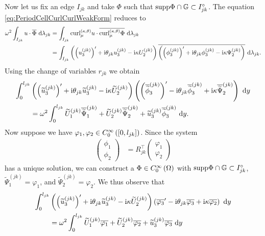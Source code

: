 Now let us fix an edge $I_{jk}$ and take $\Phi$ such that $\mathrm{supp}\Phi\cap\mathbb{G}\subset I_{jk}^{\circ}$.
The equation \eqref{eq:PeriodCellCurlCurlWeakForm} reduces to
\begin{align*}
	\omega^2 \int_{I_{jk}} u\cdot\overline{\Phi}  \ \mathrm{d}\lambda_{jk}
	&= \int_{I_{jk}} \mathrm{curl}_{\mu}^{\left( \kappa, \theta \right)}u\cdot\overline{\mathrm{curl}_{\mu}^{\left( \kappa, \theta \right)}\Phi}  \ \mathrm{d}\lambda_{jk} \\
	&= \int_{I_{jk}} \left(  \left( u_3^{(jk)} \right)' + \mathrm{i}\theta_{jk} u_3^{(jk)} - \mathrm{i}\kappa U_2^{(jk)}  \right)\overline{\left(  \left( \phi_3^{(jk)} \right)' + \mathrm{i}\theta_{jk} \phi_3^{(jk)} - \mathrm{i}\kappa \Psi_2^{(jk)}  \right)}  \ \mathrm{d}\lambda_{jk}.
\end{align*}
Using the change of variables $r_{jk}$ we obtain
\begin{align*}
	\int_0^{l_{jk}} & \left(  \left( \widetilde{u}_3^{(jk)} \right)' + \mathrm{i}\theta_{jk} \widetilde{u}_3^{(jk)} - \mathrm{i}\kappa \widetilde{U}_2^{(jk)}  \right) \left(  \left( \overline{\widetilde{\phi}}_3^{(jk)} \right)' - \mathrm{i}\theta_{jk} \overline{\widetilde{\phi}}_3^{(jk)} + \mathrm{i}\kappa \overline{\widetilde{\Psi}}_2^{(jk)}  \right) \ \mathrm{d} y \\
	&= \omega^2 \int_0^{l_{jk}} \widetilde{U}_1^{(jk)}\overline{\widetilde{\Psi}}_1^{(jk)} + \widetilde{U}_2^{(jk)}\overline{\widetilde{\Psi}}_2^{(jk)} + \widetilde{u}_3^{(jk)}\overline{\widetilde{\phi}}_3^{(jk)} \ \mathrm{d} y.
\end{align*}
Now suppose we have $\varphi_1,\varphi_2\in C^{\infty}_{0}\left( \left[ 0,l_{jk} \right] \right)$.
Since the system
\begin{align*}
	\begin{pmatrix} \phi_1 \\ \phi_2 \end{pmatrix} &= R_{jk}^\top \begin{pmatrix} \varphi_1 \\ \varphi_2 \end{pmatrix}
\end{align*}
has a unique solution, we can construct a $\Phi\in C^{\infty}_{0}\left( \Omega \right)$ with $\mathrm{supp}\Phi\cap\mathbb{G}\subset I_{jk}^{\circ}$, $\widetilde{\Psi}_1^{(jk)}=\varphi_1$, and $\widetilde{\Psi}_2^{(jk)}=\varphi_2$.
We thus observe that
\begin{align*}
	\int_0^{l_{jk}} & \left(  \left( \widetilde{u}_3^{(jk)} \right)' + \mathrm{i}\theta_{jk} \widetilde{u}_3^{(jk)} - \mathrm{i}\kappa \widetilde{U}_2^{(jk)}  \right) \left(  \overline{\varphi_3}' - \mathrm{i}\theta_{jk} \overline{\varphi_3} + \mathrm{i}\kappa \overline{\varphi_2}  \right) \ \mathrm{d} y \\
	&= \omega^2 \int_0^{l_{jk}} \widetilde{U}_1^{(jk)}\overline{\varphi_1} + \widetilde{U}_2^{(jk)}\overline{\varphi_2} + \widetilde{u}_3^{(jk)}\overline{\varphi_3} \ \mathrm{d} y
\end{align*}
